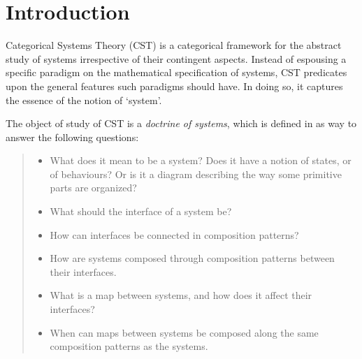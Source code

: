 
\section{Introduction}



Categorical Systems Theory (CST) is a categorical framework for the abstract study of systems irrespective of their contingent aspects.
%
Instead of espousing a specific paradigm on the mathematical specification of systems, CST predicates upon the general features such paradigms should have.
In doing so, it captures the essence of the notion of `system'.

The object of study of CST is a \emph{doctrine of systems}, which is defined in \cite{myers_categorical_2022} as way to answer the following questions:
\begin{quote}
	\begin{itemize}
		\item What does it mean to be a system? Does it have a notion of states, or of behaviours? Or is it a diagram describing the way some primitive parts are organized?
		\item What should the interface of a system be?
		\item How can interfaces be connected in composition patterns?
		\item How are systems composed through composition patterns between their interfaces.
		\item What is a map between systems, and how does it affect their interfaces?
		\item When can maps between systems be composed along the same composition patterns as the systems.
	 \end{itemize}
\end{quote}

